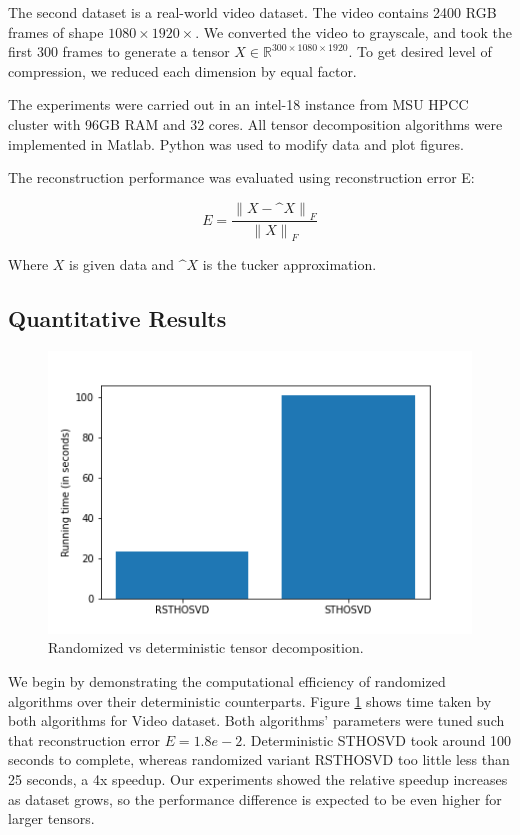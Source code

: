 \documentclass[preprint]{elsarticle}
\begin{document}
\noindent The second dataset is a real-world video dataset. The video contains 2400 RGB frames of shape $1080\times1920\times$. We converted the video to grayscale, and took the first 300 frames to generate a tensor $X \in \mathbb{R}^{300\times1080\times1920}$. To get desired level of compression, we reduced each dimension by equal factor.

\noindent The experiments were carried out in an intel-18 instance from MSU HPCC cluster with 96GB RAM and 32 cores. All tensor decomposition algorithms were implemented in Matlab. Python was used to modify data and plot figures. 

\noindent The reconstruction performance was evaluated using reconstruction error E:

\begin{equation*}
    E = \frac{{\lVert X-\^{X} \rVert}_F}{{\lVert X \rVert}_F}
\end{equation*}

\noindent Where $X$ is given data and $\^{X}$ is the tucker approximation.

\subsection{Quantitative Results}


\begin{figure}[h]
    \centering
    \includegraphics[scale=0.7]{figs/rVSd.png}
    \caption{Randomized vs deterministic tensor decomposition.}
    \label{rvsd}
\end{figure}

We begin by demonstrating the computational efficiency of randomized algorithms over their deterministic counterparts. Figure \ref{rvsd} shows time taken by both algorithms for Video dataset. Both algorithms' parameters were tuned such that reconstruction error $E=1.8e-2$. Deterministic STHOSVD took around 100 seconds to complete, whereas randomized variant RSTHOSVD too little less than 25 seconds, a 4x speedup. Our experiments showed the relative speedup increases as dataset grows, so the performance difference is expected to be even higher for larger tensors. 
\end{document}
